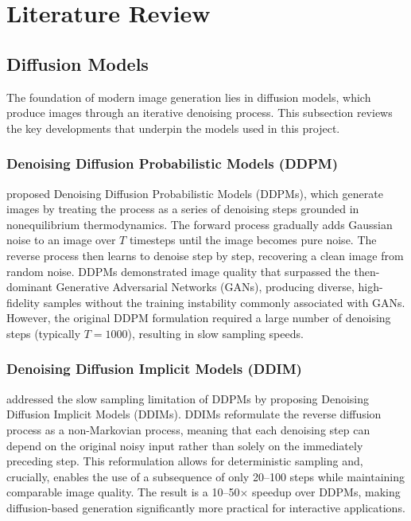 \documentclass[12pt,a4paper]{report}
\begin{document}
\newpage

\section{Literature Review}
\label{sec:literature_review}

\subsection{Diffusion Models}

The foundation of modern image generation lies in diffusion models, which produce images through an iterative denoising process. This subsection reviews the key developments that underpin the models used in this project.

\subsubsection{Denoising Diffusion Probabilistic Models (DDPM)}

\citet{ho2020ddpm} proposed Denoising Diffusion Probabilistic Models (DDPMs), which generate images by treating the process as a series of denoising steps grounded in nonequilibrium thermodynamics. The forward process gradually adds Gaussian noise to an image over $T$ timesteps until the image becomes pure noise. The reverse process then learns to denoise step by step, recovering a clean image from random noise. DDPMs demonstrated image quality that surpassed the then-dominant Generative Adversarial Networks (GANs), producing diverse, high-fidelity samples without the training instability commonly associated with GANs. However, the original DDPM formulation required a large number of denoising steps (typically $T = 1000$), resulting in slow sampling speeds.

\subsubsection{Denoising Diffusion Implicit Models (DDIM)}

\citet{song2021ddim} addressed the slow sampling limitation of DDPMs by proposing Denoising Diffusion Implicit Models (DDIMs). DDIMs reformulate the reverse diffusion process as a non-Markovian process, meaning that each denoising step can depend on the original noisy input rather than solely on the immediately preceding step. This reformulation allows for deterministic sampling and, crucially, enables the use of a subsequence of only 20--100 steps while maintaining comparable image quality. The result is a 10--50$\times$ speedup over DDPMs, making diffusion-based generation significantly more practical for interactive applications.
\end{document}
